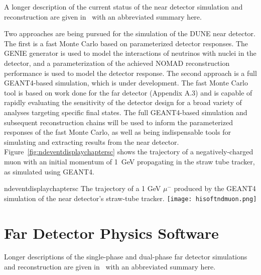 A longer description of the current status of the near detector
simulation and reconstruction are given in \anxreco\ with an
abbreviated summary here.

Two approaches are being  pursued for the simulation of
the DUNE near detector.  The first is a fast Monte Carlo based on
parameterized detector responses. The GENIE\cite{GENIE} generator is
used to model the interactions of neutrinos with nuclei in the
detector, and a parameterization of the achieved NOMAD reconstruction
performance is used to model the detector response.  The second
approach is a full GEANT4-based simulation, which is under
development.  The fast Monte Carlo tool is based on work done for the
far detector\cite{Adams:2013qkq} (Appendix A.3) and is capable of
rapidly evaluating the sensitivity of the detector design for a broad
variety of analyses targeting specific final states.  The full
GEANT4-based simulation and subsequent reconstruction chains will be
used to inform the parameterized responses of the fast Monte Carlo, as
well as being indispensable tools for simulating and extracting
results from the near detector.
Figure~\ref{fig:ndeventdisplaychaptersc} shows the trajectory of a
negatively-charged muon with an initial momentum of 1~GeV propagating
in the straw tube tracker, as simulated using GEANT4.
\begin{cdrfigure}{ndeventdisplaychaptersc}
{The trajectory of a 1 GeV $\mu^-$ produced by the GEANT4 simulation of the near detector's straw-tube tracker.}
\texttt{[image: hisoftndmuon.png]}
\end{cdrfigure}

\section{Far Detector Physics Software}
\label{sec:detectors-sc-physics-software}

Longer descriptions of the single-phase and dual-phase far detector
simulations and reconstruction are given in \anxreco\ with an
abbreviated summary here.

%

